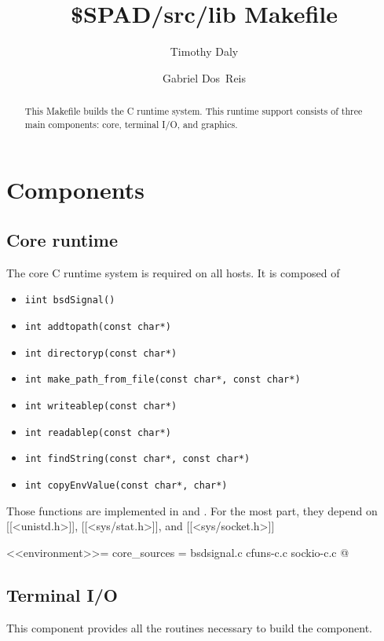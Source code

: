 \documentclass{article}
\title{\$SPAD/src/lib Makefile}
\author{Timothy Daly \and Gabriel Dos~Reis}
\begin{document}
\maketitle

\begin{abstract}
  This Makefile builds the  C runtime system.  This runtime
  support consists of three main components: core, terminal I/O, and
  graphics.
\end{abstract}
\eject

\tableofcontents
\eject

\section{Components}

\subsection{Core runtime}

The core C runtime system is required on all hosts. It is composed of
\begin{itemize}
\item \verb!iint bsdSignal()!
\item \verb!int addtopath(const char*)!
\item \verb!int directoryp(const char*)!
\item \verb!int make_path_from_file(const char*, const char*)!
\item \verb!int writeablep(const char*)!
\item \verb!int readablep(const char*)!
\item \verb!int findString(const char*, const char*)!
\item \verb!int copyEnvValue(const char*, char*)!
\end{itemize}

Those functions are implemented in  and
.  For the most part,
they depend on [[<unistd.h>]], [[<sys/stat.h>]], and
[[<sys/socket.h>]]

<<environment>>=
core_sources = bsdsignal.c cfuns-c.c sockio-c.c
@


\subsection{Terminal I/O}

This component provides all the routines necessary to build
the  component.
\end{document}

